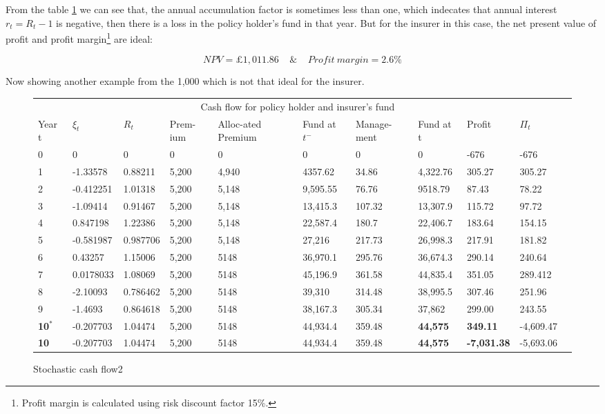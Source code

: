 \documentclass{report}
\begin{document}
From the table \ref{stoch-cashflow} we can see that, the annual accumulation factor is sometimes less than one, which indecates that annual interest $r_t = R_t - 1$ is negative, then there is a loss in the policy holder's fund in that year. But for the insurer in this case, the net present value of profit and profit margin\footnote{Profit margin is calculated using risk discount factor 15\%.} are ideal: 

\[
NPV=\pounds 1,011.86\ \ \ \   \   \& \    \ \ \ \       Profit \  margin = 2.6\%
\]

Now showing another example from the 1,000 which is not that ideal for the insurer.

\begin{figure}[H]
    \centering
\begin{tabular}{p{0.5cm} p{1.5cm} p{1.3cm} p{1cm} p{1.5cm} p{1.2cm} p{1.3cm} p{1.3cm}p{1.6cm}p{1.5cm}p{1.3cm} }
\toprule
\multicolumn{10}{c}{Cash flow for policy holder and insurer's fund} \\
\cmidrule(r){3-8}

Year t & $\xi_t$ &$R_t$ & Prem-ium & Alloc-ated Premium & Fund at $t^-$ &Manage-ment & Fund at t& Profit& $\Pi_t$ \\
\midrule
0&0&0&0&0&0&0&0&-676&-676\\
1&-1.33578&0.88211&5,200&4,940&4357.62&34.86&4,322.76&305.27&305.27\\
2&-0.412251&1.01318&5,200&5,148&9,595.55&76.76&9518.79&87.43&78.22\\
3&-1.09414&0.91467&5,200&5,148&13,415.3&107.32&13,307.9&115.72&97.72\\
4&0.847198&1.22386&5,200&5,148&22,587.4&180.7&22,406.7&183.64&154.15\\
5&-0.581987&0.987706&5,200&5,148&27,216&217.73&26,998.3&217.91&181.82\\
6&0.43257&1.15006&5,200&5148&36,970.1&295.76&36,674.3&290.14&240.64\\
7&0.0178033&1.08069&5,200&5148&45,196.9&361.58&44,835.4&351.05&289.412\\
8&-2.10093&0.786462&5,200&5148&39,310&314.48&38,995.5&307.46&251.96\\
9&-1.4693&0.864618&5,200&5148&38,167.3&305.34&37,862&299.00&243.55\\
\textbf{10$^*$}&-0.207703&1.04474&5,200&5148&44,934.4&359.48&\textbf{44,575}&\textbf{349.11}&-4,609.47\\
\textbf{10}&-0.207703&1.04474&5,200&5148&44,934.4&359.48&\textbf{44,575}&\textbf{-7,031.38}&-5,693.06\\

\bottomrule
\end{tabular}
\caption{Stochastic cash flow2}
\label{stoch-cashflow}
\end{figure}
\end{document}
